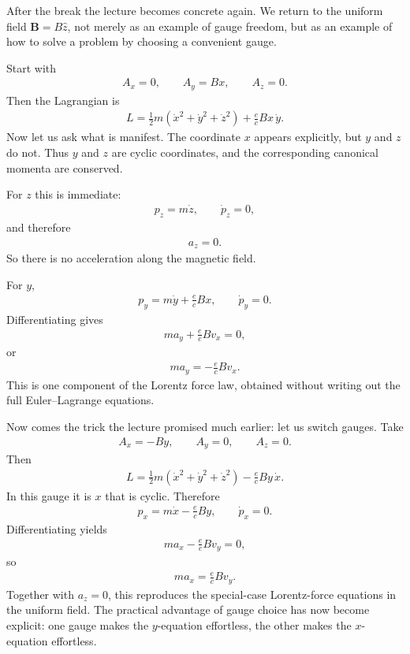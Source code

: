 After the break the lecture becomes concrete again. We return to the uniform field \(\mathbf B=B\hat z\), not merely as an example of gauge freedom, but as an example of how to solve a problem by choosing a convenient gauge.

Start with
\begin{align}
A_x=0,\qquad A_y=Bx,\qquad A_z=0.
\end{align}
Then the Lagrangian is
\begin{align}
L
=
\frac{1}{2}m\left(\dot x^2+\dot y^2+\dot z^2\right)
+
\frac{e}{c}Bx\,\dot y.
\end{align}
Now let us ask what is manifest. The coordinate \(x\) appears explicitly, but \(y\) and \(z\) do not. Thus \(y\) and \(z\) are cyclic coordinates, and the corresponding canonical momenta are conserved.

For \(z\) this is immediate:
\begin{align}
p_z=m\dot z,\qquad \dot p_z=0,
\end{align}
and therefore
\begin{align}
a_z=0.
\end{align}
So there is no acceleration along the magnetic field.

For \(y\),
\begin{align}
p_y=m\dot y+\frac{e}{c}Bx,\qquad \dot p_y=0.
\end{align}
Differentiating gives
\begin{align}
m a_y+\frac{e}{c}B v_x=0,
\end{align}
or
\begin{align}
m a_y=-\frac{e}{c}B v_x.
\end{align}
This is one component of the Lorentz force law, obtained without writing out the full Euler--Lagrange equations.

Now comes the trick the lecture promised much earlier: let us switch gauges. Take
\begin{align}
A_x=-By,\qquad A_y=0,\qquad A_z=0.
\end{align}
Then
\begin{align}
L
=
\frac{1}{2}m\left(\dot x^2+\dot y^2+\dot z^2\right)
-
\frac{e}{c}By\,\dot x.
\end{align}
In this gauge it is \(x\) that is cyclic. Therefore
\begin{align}
p_x=m\dot x-\frac{e}{c}By,\qquad \dot p_x=0.
\end{align}
Differentiating yields
\begin{align}
m a_x-\frac{e}{c}B v_y=0,
\end{align}
so
\begin{align}
m a_x=\frac{e}{c}B v_y.
\end{align}
Together with \(a_z=0\), this reproduces the special-case Lorentz-force equations in the uniform field. The practical advantage of gauge choice has now become explicit: one gauge makes the \(y\)-equation effortless, the other makes the \(x\)-equation effortless.

